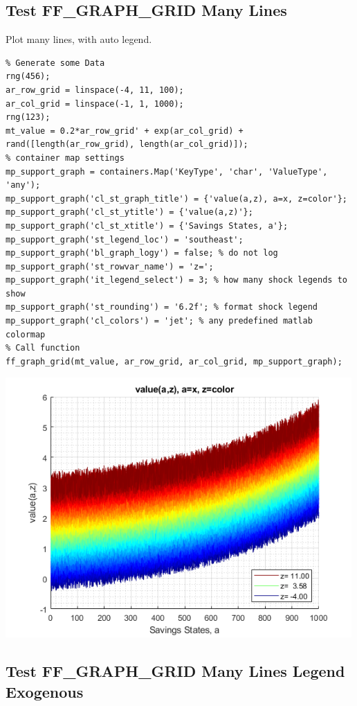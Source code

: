\documentclass[
]{book}
\begin{document}
\hypertarget{test-ff_graph_grid-many-lines}{%
\subsection{Test FF\_GRAPH\_GRID Many Lines}\label{test-ff_graph_grid-many-lines}}

Plot many lines, with auto legend.

\begin{verbatim}
% Generate some Data
rng(456);
ar_row_grid = linspace(-4, 11, 100);
ar_col_grid = linspace(-1, 1, 1000);
rng(123);
mt_value = 0.2*ar_row_grid' + exp(ar_col_grid) + rand([length(ar_row_grid), length(ar_col_grid)]);
% container map settings
mp_support_graph = containers.Map('KeyType', 'char', 'ValueType', 'any');
mp_support_graph('cl_st_graph_title') = {'value(a,z), a=x, z=color'};
mp_support_graph('cl_st_ytitle') = {'value(a,z)'};
mp_support_graph('cl_st_xtitle') = {'Savings States, a'};
mp_support_graph('st_legend_loc') = 'southeast';
mp_support_graph('bl_graph_logy') = false; % do not log
mp_support_graph('st_rowvar_name') = 'z=';
mp_support_graph('it_legend_select') = 3; % how many shock legends to show
mp_support_graph('st_rounding') = '6.2f'; % format shock legend
mp_support_graph('cl_colors') = 'jet'; % any predefined matlab colormap
% Call function
ff_graph_grid(mt_value, ar_row_grid, ar_col_grid, mp_support_graph);
\end{verbatim}

\includegraphics[width=5.20833in,height=\textheight]{img/fx_graph_grid_images/figure_6.png}

\hypertarget{test-ff_graph_grid-many-lines-legend-exogenous}{%
\subsection{Test FF\_GRAPH\_GRID Many Lines Legend Exogenous}\label{test-ff_graph_grid-many-lines-legend-exogenous}}
\end{document}
